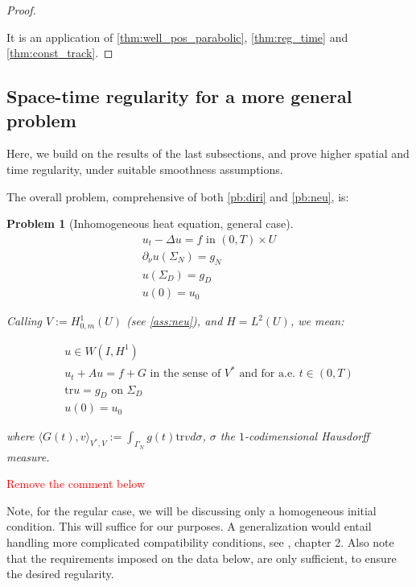 \documentclass[english,a4paper,9pt,oneside]{scrbook}	%
\theoremstyle{break}
\newtheorem{pb}[equation]{Problem}
\newenvironment{mproof}[1][\proofname]{%
  \begin{proof}[#1]$ $\par\nobreak\ignorespaces
}{%
  \end{proof}
}
\renewcommand*{\proofname}{Proof}
\theoremstyle{remark}
\newcommand{\tr}{\text{tr}}
\begin{document}
\begin{appendices}
\begin{mproof}
It is an application of \cref{thm:well_pos_parabolic}, \cref{thm:reg_time} and \cref{thm:const_track}.
\end{mproof}

\subsection{Space-time regularity for a more general problem}

Here, we build on the results of the last subsections, and prove higher spatial and time regularity, under suitable smoothness assumptions.

The overall problem, comprehensive of both \cref{pb:diri} and \cref{pb:neu}, is:

\begin{pb}[Inhomogeneous heat equation, general case]
\label{pb:mix}
\begin{align*}
u_t - \Delta u = f \text{ in } (0,T)\times U\\
\partial_\nu u(\Sigma_N)=g_N\\
u(\Sigma_D)=g_D\\
u(0)=u_0
\end{align*}

Calling $V:=H^1_{0,m}(U)$ (see \cref{ass:neu}), and $H=L^2(U)$, we mean:

\begin{align*}
u \in W(I,H^1) \\
u_t + A u = f + G \text{ in the sense of } V^* \text{ and for a.e. } t \in (0,T) \\
\tr u =g_D \text{ on } \Sigma_D\\
u(0)=u_0
\end{align*}

where $\langle G(t), v \rangle_{V^*,V}:=\int_{\Gamma_N} g(t)\tr v d\sigma$, $\sigma$ the $1$-codimensional Hausdorff measure.

\end{pb}

\textcolor{red}{Remove the comment below}

Note, for the regular case, we will be discussing only a homogeneous initial condition. This will suffice for our purposes. A generalization would entail handling more complicated compatibility conditions, see \cite{lions}, chapter 2. Also note that the requirements imposed on the data below, are only sufficient, to ensure the desired regularity.


\end{appendices}
\end{document}
